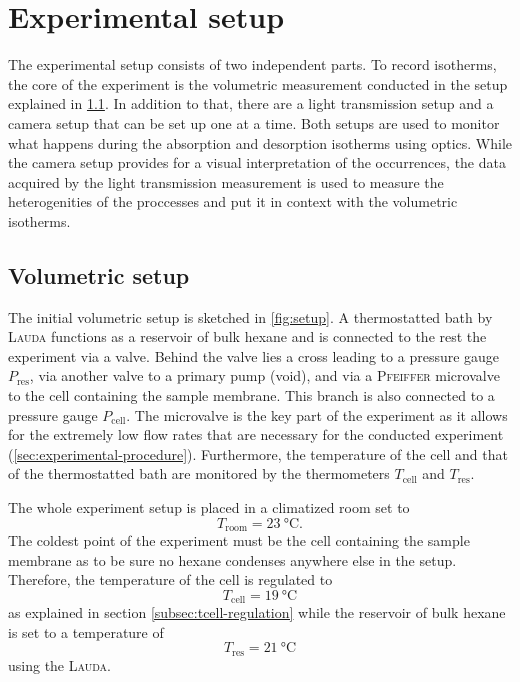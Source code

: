 \documentclass[../thesis.tex]{subfiles}
\begin{document}
    \section{Experimental setup}
    \label{sec:exp-setup}

        The experimental setup consists of two independent parts. To record isotherms, the core of the experiment is the volumetric measurement conducted in the setup explained in \cref{subsec:volumetric-setup}. In addition to that, there are a light transmission setup and a camera setup that can be set up one at a time. Both setups are used to monitor what happens during the absorption and desorption isotherms using optics. While the camera setup provides for a visual interpretation of the occurrences, the data acquired by the light transmission measurement is used to measure the heterogenities of the proccesses and put it in context with the volumetric isotherms.


        \subsection{Volumetric setup}
        \label{subsec:volumetric-setup}

            The initial volumetric setup is sketched in \cref{fig:setup}. A thermostatted bath by \textsc{Lauda} functions as a reservoir of bulk hexane and is connected to the rest the experiment via a valve. Behind the valve lies a cross leading to a pressure gauge $P_\mathrm{res}$, via another valve to a primary pump (void), and via a \textsc{Pfeiffer} microvalve to the cell containing the sample membrane. This branch is also connected to a pressure gauge $P_\mathrm{cell}$. The microvalve is the key part of the experiment as it allows for the extremely low flow rates that are necessary for the conducted experiment (\cref{sec:experimental-procedure}). Furthermore, the temperature of the cell and that of the thermostatted bath are monitored by the thermometers $T_\mathrm{cell}$ and $T_\mathrm{res}$.
            \medskip

            

            The whole experiment setup is placed in a climatized room set to \begin{equation}
                T_\mathrm{room} = \SI{23}{\celsius}.
            \end{equation}
            The coldest point of the experiment must be the cell containing the sample membrane as to be sure no hexane condenses anywhere else in the setup. Therefore, the temperature of the cell is regulated to
            \begin{equation}
                T_\mathrm{cell} = \SI{19}{\celsius}
            \end{equation}
            as explained in section \cref{subsec:tcell-regulation} while the reservoir of bulk hexane is set to a temperature of
            \begin{equation}
                T_\mathrm{res} = \SI{21}{\celsius}
            \end{equation}
            using the \textsc{Lauda}.
\end{document}

